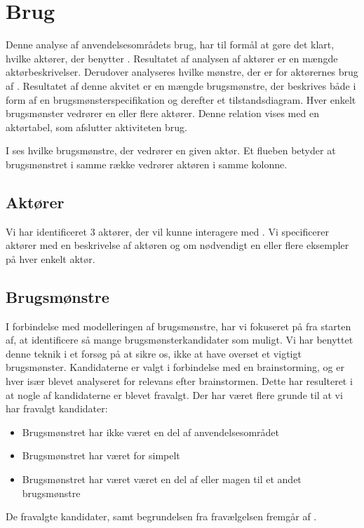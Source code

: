 \section{Brug}
\label{sec:brug}
Denne analyse af anvendelsesområdets brug, har til formål at gøre det klart, hvilke aktører, der benytter \Foodl. Resultatet af analysen af aktører er en mængde aktørbeskrivelser. Derudover analyseres hvilke mønstre, der er for aktørernes brug af \Foodl. Resultatet af denne akvitet er en mængde brugsmønstre, der beskrives både i form af en brugsmønsterspecifikation og derefter et tilstandsdiagram. Hver enkelt brugsmønster vedrører en eller flere aktører. Denne relation vises med en aktørtabel, som afslutter aktiviteten brug.

I  ses hvilke brugsmønstre, der vedrører en given aktør. Et flueben betyder at brugsmønstret i samme række vedrører aktøren i samme kolonne.



\subsection{Aktører}
\label{sec:aktoerer}
Vi har identificeret 3 aktører, der vil kunne interagere med \Foodl. Vi specificerer aktører med en beskrivelse af aktøren og om nødvendigt en eller flere eksempler på hver enkelt aktør.



\subsection{Brugsmønstre}
\label{subsec:brugsmoenstre}
I forbindelse med modelleringen af brugsmønstre, har vi fokuseret på fra starten af, at identificere så mange brugsmønsterkandidater som muligt. Vi har benyttet denne teknik i et forsøg på at sikre os, ikke at have overset et vigtigt brugsmønster. Kandidaterne er valgt i forbindelse med en brainstorming, og er hver især blevet analyseret for relevans efter brainstormen. Dette har resulteret i at nogle af kandidaterne er blevet fravalgt. Der har været flere grunde til at vi har fravalgt kandidater:
\begin{itemize}
\item Brugsmønstret har ikke været en del af anvendelsesområdet
\item Brugsmønstret har været for simpelt
\item Brugsmønstret har været været en del af eller magen til et andet brugsmønstre
\end{itemize}
De fravalgte kandidater, samt begrundelsen fra fravælgelsen fremgår af .

